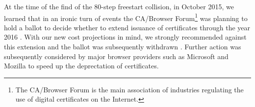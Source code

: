 \medskip

At the time of the find of the 80-step freestart collision, in October 2015, we learned that in an ironic turn of events the CA/Browser Forum\footnote{The CA/Browser Forum is the main association of industries regulating the use of digital certificates on the Internet.}
was planning to hold a ballot to decide whether to extend issuance of \shaone certificates through the year 2016 \cite{cabforum}.
With our new cost projections in mind, we strongly recommended against this extension and the ballot was subsequently withdrawn \cite{cabforum2}.
Further action was subsequently considered by major browser providers such as Microsoft \cite{MS_sha} and Mozilla \cite{Moz_sha} to speed up the deprectation of \shaone certificates.
